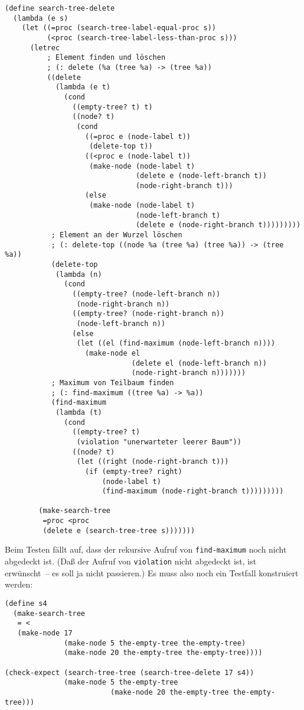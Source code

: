 \begin{verbatim}
(define search-tree-delete
  (lambda (e s)
    (let ((=proc (search-tree-label-equal-proc s))
          (<proc (search-tree-label-less-than-proc s)))
      (letrec
          ; Element finden und löschen
          ; (: delete (%a (tree %a) -> (tree %a))
          ((delete
            (lambda (e t)
              (cond
                ((empty-tree? t) t)
                ((node? t)
                 (cond
                   ((=proc e (node-label t))
                    (delete-top t))
                   ((<proc e (node-label t))
                    (make-node (node-label t)
                               (delete e (node-left-branch t))
                               (node-right-branch t)))
                   (else
                    (make-node (node-label t)
                               (node-left-branch t)
                               (delete e (node-right-branch t)))))))))
           ; Element an der Wurzel löschen
           ; (: delete-top ((node %a (tree %a) (tree %a)) -> (tree %a))
           (delete-top
            (lambda (n)
              (cond
                ((empty-tree? (node-left-branch n))
                 (node-right-branch n))
                ((empty-tree? (node-right-branch n))
                 (node-left-branch n))
                (else
                 (let ((el (find-maximum (node-left-branch n))))
                   (make-node el
                              (delete el (node-left-branch n))
                              (node-right-branch n)))))))
           ; Maximum von Teilbaum finden
           ; (: find-maximum ((tree %a) -> %a))
           (find-maximum
            (lambda (t)
              (cond
                ((empty-tree? t)
                 (violation "unerwarteter leerer Baum"))
                ((node? t)
                 (let ((right (node-right-branch t)))
                   (if (empty-tree? right)
                       (node-label t)
                       (find-maximum (node-right-branch t)))))))))
           
        (make-search-tree
         =proc <proc
         (delete e (search-tree-tree s)))))))
\end{verbatim}
%
Beim Testen fällt auf, dass der rekursive Aufruf von
\texttt{find-maximum} noch nicht abgedeckt ist.  (Daß der Aufruf von
\texttt{violation} nicht abgedeckt ist, ist erwünscht~-- es soll ja
nicht passieren.)  Es muss also noch ein Testfall konstruiert werden:
%
\begin{verbatim}
(define s4
  (make-search-tree
   = <
   (make-node 17
              (make-node 5 the-empty-tree the-empty-tree)
              (make-node 20 the-empty-tree the-empty-tree))))

(check-expect (search-tree-tree (search-tree-delete 17 s4))
              (make-node 5 the-empty-tree
                         (make-node 20 the-empty-tree the-empty-tree)))
\end{verbatim}
%

